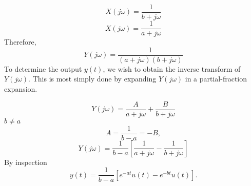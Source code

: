 \begin{frame}
    {
        \begin{equation*}
            X(j\omega) = \frac{1}{b+j\omega}
        \end{equation*}
        \pause
        \begin{equation*}
            X(j\omega) = \frac{1}{a+j\omega}
        \end{equation*}  
        \pause
        Therefore,  
        \begin{equation*}
            Y(j\omega) = \frac{1}{(a+j\omega)(b+j\omega)}
        \end{equation*}          
        To determine the output $y(t)$, we wish to obtain the inverse transform of $Y(j\omega)$. This is most simply done by expanding $Y(j\omega)$ in a partial-fraction expansion.
    }
\end{frame}

\begin{frame}
    {
        \begin{equation*}
            Y(j\omega) = \frac{A}{a+j\omega} + \frac{B}{b+j\omega}
        \end{equation*}
        \pause
        $b \neq a$
        \begin{equation*}
            A = \frac{1}{b-a} = -B,
        \end{equation*}
        \begin{equation*}
            Y(j\omega) = \frac{1}{b-a}\left[\frac{1}{a+j\omega} - \frac{1}{b+j\omega}\right]
        \end{equation*}
        \pause
        By inspection
        \begin{equation*}
            y(t) = \frac{1}{b-a}\left[ e^{-at}u(t) - e^{-bt}u(t)\right].
        \end{equation*}
    }
\end{frame}


